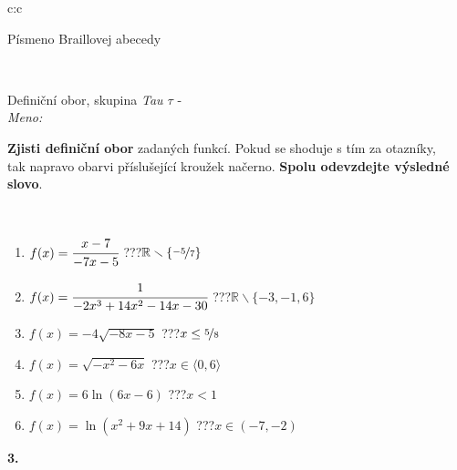 \documentclass[10pt]{report}
\begin{document}
\begin{tabular}{c:c}
\begin{minipage}[c][104.5mm][t]{0.5\linewidth}
\begin{center}
\begin{minipage}{0.20\linewidth}
\begin{center}
{\small Písmeno Braillovej abecedy}
\end{center}
\end{minipage}
\end{center}
\end{minipage}
\\ \hdashline
\begin{minipage}[c][104.5mm][t]{0.5\linewidth}
\begin{center}
\vspace{7mm}
{\huge Definiční obor, skupina \textit{Tau $\tau$} -}\\[5mm]
\textit{Meno:}\phantom{xxxxxxxxxxxxxxxxxxxxxxxxxxxxxxxxxxxxxxxxxxxxxxxxxxxxxxxxxxxxxxxxx}\\[5mm]
\begin{minipage}{0.95\linewidth}
\textbf{Zjisti definiční obor} zadaných funkcí. Pokud se shoduje s tím za otazníky,\\tak napravo obarvi příslušející kroužek načerno. \textbf{Spolu odevzdejte výsledné slovo}.
\end{minipage}
\\[1mm]
\begin{minipage}{0.79\linewidth}
\begin{center}
\begin{varwidth}{\linewidth}
\begin{enumerate}
\normalsizerrr
\item $f(x)=\cfrac{x-7}{-7x-5}$\quad \dotfill\; ???\;\dotfill \quad $\mathbb{R}\smallsetminus\{\nicefrac{-5}{7}\}$
\item $f(x)=\cfrac{1}{-2x^3+14x^2-14x-30}$\quad \dotfill\; ???\;\dotfill \quad $\mathbb{R}\smallsetminus\{-3,-1,6\}$
\item $f(x)=-4\sqrt{-8x-5}$\quad \dotfill\; ???\;\dotfill \quad $x\leq\nicefrac{5}{8}$
\item $f(x)=\sqrt{-x^2-6x}$\quad \dotfill\; ???\;\dotfill \quad $x\in\langle0 , 6\rangle$
\item $f(x)=6\ln{(6x-6)}$\quad \dotfill\; ???\;\dotfill \quad $x<1$
\item $f(x)=\ln{(x^2+9x+14)}$\quad \dotfill\; ???\;\dotfill \quad $x\in(-7 , -2)$
\end{enumerate}
\end{varwidth}
\end{center}
\end{minipage}
\begin{minipage}{0.20\linewidth}
\begin{center}
{\Huge\bfseries 3.} \\[2mm]

\end{center}
\end{minipage}
\end{center}
\end{minipage}
\end{tabular}
\end{document}
